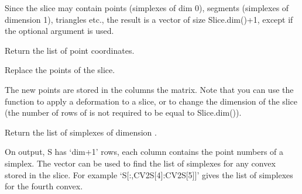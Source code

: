 \documentclass[a4paper,11pt,english]{sphinxmanual}
\begin{document}
\begin{fulllineitems}
\begin{fulllineitems}
Since the slice may contain points (simplexes of dim 0), segments
(simplexes of dimension 1), triangles etc., the result is a vector
of size Slice.dim()+1, except if the optional argument 
is used.

\end{fulllineitems}


\begin{fulllineitems}
\label{\detokenize{python/cmdref_Slice:getfem.Slice.pts}}
Return the list of point coordinates.

\end{fulllineitems}


\begin{fulllineitems}
\label{\detokenize{python/cmdref_Slice:getfem.Slice.set_pts}}
Replace the points of the slice.

The new points  are stored in the columns the matrix. Note that
you can use the function to apply a deformation to a slice, or to
change the dimension of the slice (the number of rows of  is not
required to be equal to Slice.dim()).

\end{fulllineitems}


\begin{fulllineitems}
\label{\detokenize{python/cmdref_Slice:getfem.Slice.splxs}}
Return the list of simplexes of dimension .

On output, S has ‘dim+1’ rows, each column contains the point
numbers of a simplex.  The vector  can be used to find the
list of simplexes for any convex stored in the slice. For example
‘S{[}:,CV2S{[}4{]}:CV2S{[}5{]}{]}’
gives the list of simplexes for the fourth convex.

\end{fulllineitems}


\end{fulllineitems}
\end{document}
